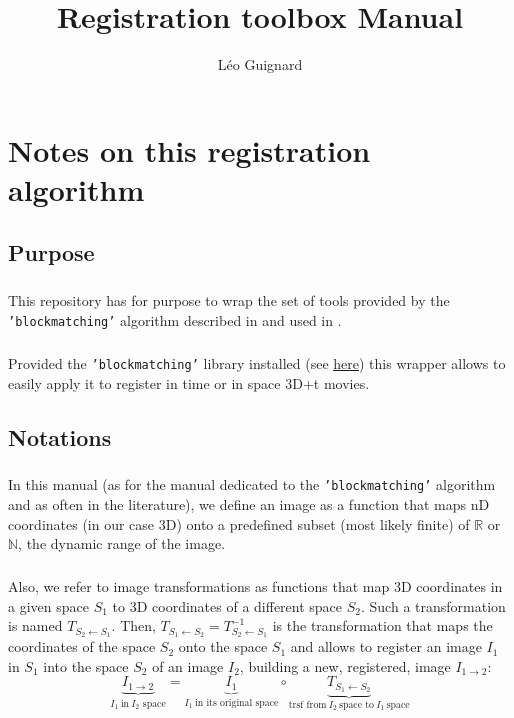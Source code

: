 \documentclass[10pt,a4paper]{book}
\author{L\'eo Guignard}
\title{Registration toolbox Manual}
\newcommand{\option}[1]{{\texttt{'#1'}}}
\newcommand{\T}[2]{T_{{#1}\leftarrow{#2}}}
\begin{document}
\maketitle
\tableofcontents
\chapter{Notes on this registration algorithm}
\section{Purpose}
\paragraph{}This repository has for purpose to wrap the set of tools provided by the \option{blockmatching} algorithm described in \citep{Ourselin:2000aa} and used in \citep{McDole:2018aa,Guignard:2020aa,Guignard:2014aa}.
\paragraph{}Provided the \option{blockmatching} library installed (see \href{https://gitlab.inria.fr/greg/Klab-BlockMatching}{\underline{here}}) this wrapper allows to easily apply it to register in time or in space 3D+t movies.
\section{Notations}
\paragraph{}In this manual (as for the manual dedicated to the \option{blockmatching} algorithm and as often in the literature), we define an image as a function that maps nD coordinates (in our case 3D) onto a predefined subset (most likely finite) of $\mathbb{R}$ or $\mathbb{N}$, the dynamic range of the image.
\paragraph{}Also, we refer to image transformations as functions that map 3D coordinates in a given space $S_1$ to 3D coordinates of a different space $S_2$. Such a transformation is named $\T{S_2}{S_1}$. Then, $\T{S_1}{S_2}=\T{S_2}{S_1}^{-1}$ is the transformation that maps the coordinates of the space $S_2$ onto the space $S_1$ and allows to register an image $I_1$ in $S_1$ into the space $S_2$ of an image $I_2$, building a new, registered, image $I_{1\rightarrow 2}$:
\begin{equation*}
\underbrace{I_{1\rightarrow 2}}_{I_1~\text{in}~I_2\text{~space}} = \underbrace{I_1}_{I_1~\text{in its original space}} \circ \underbrace{\T{S_1}{S_2}}_{\text{trsf from}~I_2~\text{space to}~I_1~\text{space}}
\end{equation*}
\end{document}
